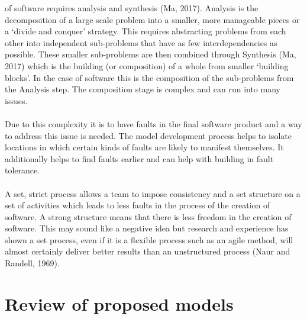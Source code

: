 \documentclass{CRPITStyle}
\begin{document}
		of software requires analysis and synthesis (Ma, 2017). Analysis is the decomposition of a large scale problem into a smaller, more manageable
		pieces or a `divide and conquer' strategy. This requires abstracting problems from each other into independent sub-problems that have as
		few interdependencies as possible. These smaller sub-problems are then combined through Synthesis (Ma, 2017) which is the building (or composition) of
		a whole from smaller `building blocks'. In the case of software this is the composition of the sub-problems from the Analysis step. The composition stage
		is complex and can run into many issues.\\
		~\\
		Due to this complexity it is to have faults in the final software product and a way to address this issue is needed. The model development process
		helps to isolate locations in which certain kinds of faults are likely to manifest themselves. It additionally helps to find faults earlier and can help with
		building in fault tolerance.\\
		~\\
		A set, strict process allows a team to impose consistency and a set structure on a set of activities which leads to less faults in the process of the creation
		of software. A strong structure means that there is less freedom in the creation of software. This may sound like a negative idea but research and experience
		has shown a set process, even if it is a flexible process such as an agile method, will almost certainly deliver better results than an unstructured process 
		(Naur and Randell, 1969).\\
		
	\section {Review of proposed models}
\end{document}
